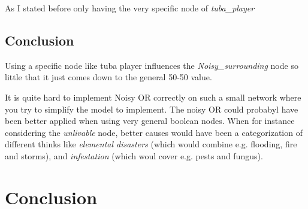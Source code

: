 \documentclass[12pt]{article} %
\begin{document}
As I stated before only having the very specific node of \emph{tuba\_player}



\subsection{Conclusion}

Using a specific node like tuba player influences the \emph{Noisy\_surrounding}
node so little that it just comes down to the general 50-50 value.

It is quite hard to implement Noisy OR correctly on such a small network where
you try to simplify the model to implement. The
noisy OR could probabyl have been better applied when using very general boolean
nodes. When for instance considering the \emph{unlivable} node, better causes
would have been a categorization of different thinks like \emph{elemental
disasters} (which would combine e.g. flooding, fire and storms), and
\emph{infestation} (which woul cover e.g. pests and fungus).









\section{Conclusion} %
\end{document}
